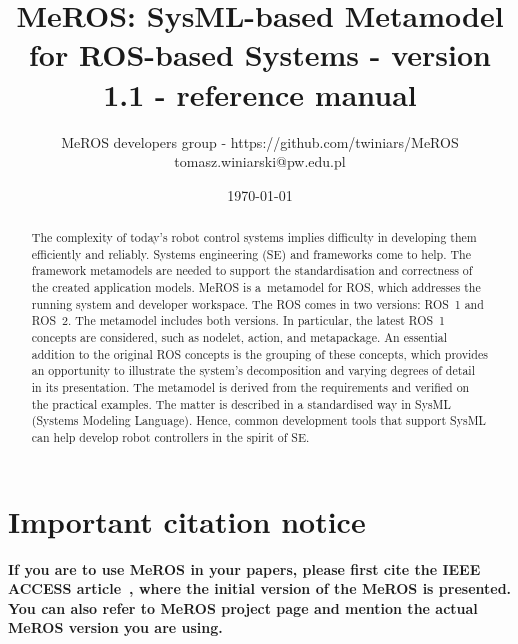 \documentclass[11pt,oneside,a4paper]{article}
\begin{document}
	
	\title{MeROS: SysML-based Metamodel for ROS-based Systems - version 1.1 - reference manual}
\author{MeROS developers group - https://github.com/twiniars/MeROS \\ tomasz.winiarski@pw.edu.pl}
\date{\today}
\maketitle


	\begin{abstract}
		The complexity of today's robot control systems implies difficulty in developing them efficiently and reliably. Systems engineering (SE) and frameworks come to help. The framework metamodels are needed to support the standardisation and correctness of the created application models. MeROS is a~metamodel for ROS, which addresses the running system and developer workspace. The ROS comes in two versions: ROS~1 and ROS~2. The metamodel includes both versions. In particular, the latest ROS~1 concepts are considered, such as nodelet, action, and metapackage. An essential addition to the original ROS concepts is the grouping of these concepts, which provides an opportunity to illustrate the system's decomposition and varying degrees of detail in its presentation. The metamodel is derived from the requirements and verified on the practical examples. The matter is described in a standardised way in SysML (Systems Modeling Language). Hence, common development tools that support SysML can help develop robot controllers in the spirit of SE.
	\end{abstract}
	
	
	
	\maketitle
	
	\section*{Important citation notice}

\textbf{If you are to use MeROS in your papers, please first cite the IEEE ACCESS  article~\cite{meros-access}, where the initial version of the MeROS is presented. You can also refer to MeROS project page \cite{meros-www} and mention the actual MeROS version you are using.}
	
	
\end{document}
